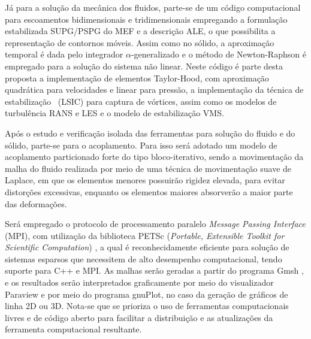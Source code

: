 Já para a solução da mecânica dos fluidos, parte-se de um código computacional para escoamentos bidimensionais e tridimensionais empregando a formulação estabilizada SUPG/PSPG do MEF e a descrição ALE, o que possibilita a representação de contornos móveis. Assim como no sólido, a aproximação temporal é dada pelo integrador $\alpha$-generalizado e o método de Newton-Raphson é empregado para a solução do sistema não linear. Neste código é parte desta proposta a implementação de elementos Taylor-Hood, com aproximação quadrática para velocidades e linear para pressão, a implementação da técnica de estabilização \LSIC\ (LSIC) para captura de vórtices, assim como os modelos de turbulência RANS e LES e o modelo de estabilização VMS.

Após o estudo e verificação isolada das ferramentas para solução do fluido e do sólido, parte-se para o acoplamento. Para isso será adotado um modelo de acoplamento particionado forte do tipo bloco-iterativo, sendo a movimentação da malha do fluido realizada por meio de uma técnica de movimentação suave de Laplace, em que os elementos menores possuirão rigidez elevada, para evitar distorções excessivas, enquanto os elementos maiores absorverão a maior parte das deformações.

Será empregado o protocolo de processamento paralelo \textit{Message Passing Interface} (MPI), com utilização da biblioteca PETSc (\textit{Portable, Extensible Toolkit for Scientific Computation}) \cite{petsc-web-page}, a qual é reconhecidamente eficiente para solução de sistemas esparsos que necessitem de alto desempenho computacional, tendo suporte para C++ e MPI.  As malhas serão geradas a partir do programa Gmsh \cite{geuzaine2009gmsh}, e os resultados serão interpretados graficamente por meio do visualizador Paraview \cite{ahrens2005paraview} e por meio do programa gnuPlot, no caso da geração de gráficos de linha 2D ou 3D. Nota-se que se prioriza o uso de ferramentas computacionais livres e de código aberto para facilitar a distribuição e as atualizações da ferramenta computacional resultante.